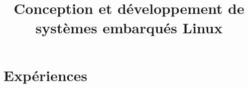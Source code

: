 \documentclass[11pt,a4paper,sans]{moderncv}   %
\title{Conception et développement de systèmes embarqués Linux}                          %
\begin{document}
\makecvtitle

\section{Expériences}
\end{document}
